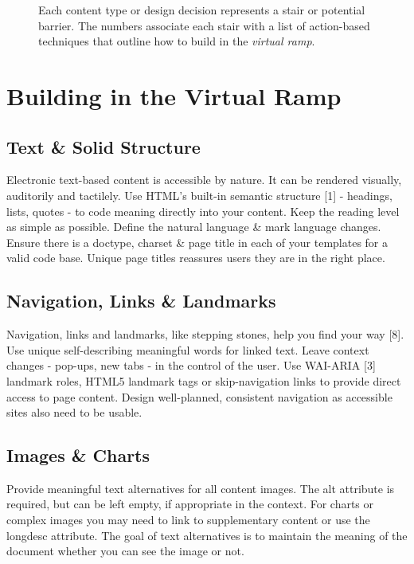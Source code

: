\documentclass{acm_proc_article-sp}
\begin{document}
\begin{figure*}
\centering
{}
\caption{Each content type or design decision represents a stair or potential barrier. The numbers associate each stair with a list of action-based techniques that outline how to build in the \textit{virtual ramp}.}
\end{figure*}

\section{Building in the {\secit Virtual} Ramp}

\subsection{Text \& Solid Structure}

Electronic text-based content is accessible by nature. It can be rendered visually, auditorily and tactilely. Use HTML's built-in semantic structure [1] - headings, lists, quotes - to code meaning directly into your content. Keep the reading level as simple as possible. Define the natural language \& mark language changes. Ensure there is a doctype, charset \& page title in each of your templates for a valid code base. Unique page titles reassures users they are in the right place.

\subsection{Navigation, Links \& Landmarks}
Navigation, links and landmarks, like stepping stones, help you find your way [8]. Use unique self-describing meaningful words for linked text. Leave context changes - pop-ups, new tabs - in the control of the user. Use WAI-ARIA [3] landmark roles, HTML5 landmark tags or skip-navigation links to provide direct access to page content. Design well-planned, consistent navigation as accessible sites also need to be usable.

\subsection{Images \& Charts}
Provide meaningful text alternatives for all content images. The alt attribute is required, but can be left empty, if appropriate in the context. For charts or complex images you may need to link to supplementary content or use the longdesc attribute. The goal of text alternatives is to maintain the meaning of the document whether you can see the image or not.
\end{document}
